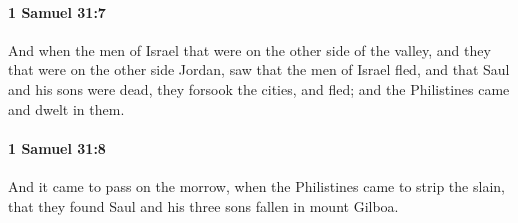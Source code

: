 		\paragraph{1 Samuel 31:7} %
			\label{1SAMUEL-31-7}

			And when the men of Israel that were on the other side of the valley, and they that were on the other side Jordan, saw that the men of Israel fled, and that Saul and his sons were dead, they forsook the cities, and fled; and the Philistines came and dwelt in them.


		\paragraph{1 Samuel 31:8} %
			\label{1SAMUEL-31-8}

			And it came to pass on the morrow, when the Philistines came to strip the slain, that they found Saul and his three sons fallen in mount Gilboa.

